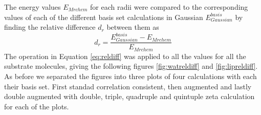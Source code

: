 \documentclass[../master_thesis.tex]{subfiles}
\begin{document}
The \mrchem energy values $E_{Mrchem}$ for each radii were compared to the
corresponding values of each of the different basis set calculations in
Gaussian  $E_{Gaussian}^{basis}$ by finding the relative difference $d_r$
between them as
\begin{equation}\label{eq:reldiff}
  d_r = \frac{E_{Gaussian}^{basis} - E_{Mrchem}}{E_{Mrchem}}
\end{equation}
The operation in Equation \ref{eq:reldiff} was applied to all the values for all the
substrate molecules, giving the following figures \ref{fig:watreldiff} and \ref{fig:lipreldiff}.
As before we separated the figures into three plots of four calculations with each
their basis set. First standad correlation consistent, then augmented and lastly double augmented
with double, triple, quadruple and quintuple zeta calculation for each of the plots.
\end{document}
